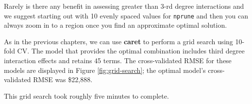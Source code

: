 \documentclass[]{krantz}
\makeatletter
\newenvironment{Shaded}{\begin{snugshade}}{\end{snugshade}}
\newcommand{\CommentTok}[1]{\textcolor[rgb]{0.37,0.37,0.37}{\textit{#1}}}
\newcommand{\DataTypeTok}[1]{\textcolor[rgb]{0.27,0.27,0.27}{#1}}
\newcommand{\DecValTok}[1]{\textcolor[rgb]{0.06,0.06,0.06}{#1}}
\newcommand{\KeywordTok}[1]{\textcolor[rgb]{0.27,0.27,0.27}{\textbf{#1}}}
\newcommand{\NormalTok}[1]{#1}
\newcommand{\OperatorTok}[1]{\textcolor[rgb]{0.43,0.43,0.43}{\textbf{#1}}}
\newcommand{\StringTok}[1]{\textcolor[rgb]{0.5,0.5,0.5}{#1}}
\newenvironment{kframe}{%
\medskip{}
\setlength{\fboxsep}{.8em}
 \def\at@end@of@kframe{}%
 \ifinner\ifhmode%
  \def\at@end@of@kframe{\end{minipage}}%
  \begin{minipage}{\columnwidth}%
 \fi\fi%
 \def\FrameCommand##1{\hskip\@totalleftmargin \hskip-\fboxsep
 \colorbox{shadecolor}{##1}\hskip-\fboxsep
     \hskip-\linewidth \hskip-\@totalleftmargin \hskip\columnwidth}%
 \MakeFramed {\advance\hsize-\width
   \@totalleftmargin\z@ \linewidth\hsize
   \@setminipage}}%
 {\par\unskip\endMakeFramed%
 \at@end@of@kframe}
\newenvironment{block}[1]
  {
  \begin{itemize}
  \renewcommand{\labelitemi}{
    \raisebox{-.7\height}[0pt][0pt]{
      {\setkeys{Gin}{width=3em,keepaspectratio}\texttt{[image: icons/\#1]}}
    }
  }
  \setlength{\fboxsep}{1em}
  \begin{kframe}
  \item
  }
  {
  \end{kframe}
  \end{itemize}
  }
\newenvironment{tip}
  {\begin{block}{tip}}
  {\end{block}}
\newenvironment{warning}
  {\begin{block}{warning}}
  {\end{block}}
\renewenvironment{Shaded}{\begin{kframe}}{\end{kframe}}
\makeatother
\begin{document}
\begin{tip}
Rarely is there any benefit in assessing greater than 3-rd degree
interactions and we suggest starting out with 10 evenly spaced values
for \texttt{nprune} and then you can always zoom in to a region once you
find an approximate optimal solution.
\end{tip}

\begin{Shaded}
\end{Shaded}

As in the previous chapters, we can use \textbf{caret} to perform a grid search using 10-fold CV. The model that provides the optimal combination includes third degree interaction effects and retains 45 terms. The cross-validated RMSE for these models are displayed in Figure \ref{fig:grid-search}; the optimal model's cross-validated RMSE was \$22,888.

\begin{warning}
This grid search took roughly five minutes to complete.
\end{warning}

\begin{Shaded}
\end{Shaded}
\end{document}
